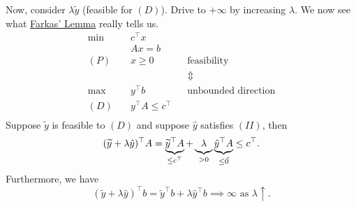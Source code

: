 \begin{remark}
	Now, consider \(\lambda \widetilde{y}\) (feasible for \((D)\)). Drive to \(+\infty \) by increasing \(\lambda\). We now see what \hyperref[lma:Farkas-lemma]{Farkas' Lemma}
	really tells us.
	\[
		\begin{aligned}
			\min~    & c^{\top} x                                               \\
			         & Ax = b                                                   \\
			(P)\quad & x\geq 0                  &  & \text{feasibility}         \\
			         &                          &  & \Updownarrow               \\
			\max~    & y^{\top}b                &  & \text{unbounded direction} \\
			(D)\quad & y^{\top} A \leq c^{\top}                                 \\
		\end{aligned}
	\]
	Suppose \(\widetilde{y}\) is feasible to \((D)\) and suppose \(\hat{y}\) satisfies \((II)\), then
	\[
		(\widetilde{y}+\lambda \hat{y})^{\top} A = \underbrace{\widetilde{y}^{\top}A}_{\leq c^{\top}} + \underbrace{\vphantom{y}\lambda}_{>0} \underbrace{\hat{y}^{\top} A}_{\leq \vec{0}} \leq c^{\top}.
	\]
	Furthermore, we have
	\[
		(\widetilde{y}+\lambda \hat{y})^{\top} b = \widetilde{y}^{\top} b+\lambda \hat{y}^{\top} b \implies \infty \text{ as } \lambda \uparrow  .
	\]
\end{remark}

